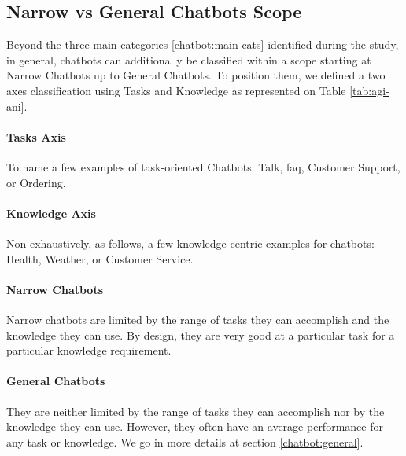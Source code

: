 \subsection{Narrow vs General Chatbots Scope}
Beyond the three main categories \ref{chatbot:main-cats} identified during the study, in general, chatbots can additionally be classified within a scope starting at Narrow Chatbots up to General Chatbots. To position them, we defined a two axes classification using Tasks and Knowledge as represented on Table \ref{tab:agi-ani}.

\paragraph{Tasks Axis}
To name a few examples of task-oriented Chatbots: Talk, \gls{faq}, Customer Support, or Ordering.

\paragraph{Knowledge Axis}
Non-exhaustively, as follows, a few knowledge-centric examples for chatbots: Health, Weather, or Customer Service.

\paragraph{Narrow Chatbots}
Narrow chatbots are limited by the range of tasks they can accomplish and the knowledge they can use. By design, they are very good at a particular task for a particular knowledge requirement.

\paragraph{General Chatbots}
They are neither limited by the range of tasks they can accomplish nor by the knowledge they can use. However, they often have an average performance for any task or knowledge. We go in more details at section \ref{chatbot:general}.


\newcommand\MyBox[2]{
  \fbox{\lower0.75cm
    \vbox to 2cm{\vfil
      \hbox to 6cm{\hfil\parbox{5cm}{#1\\#2}\hfil}
      \vfil}
  }
}

